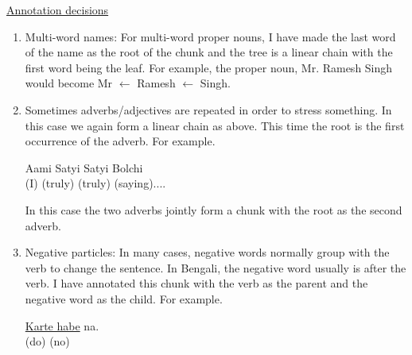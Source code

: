 \documentclass[11pt,letterpaper]{article}
\begin{document}
\underline{Annotation decisions}
\begin{enumerate}
\item Multi-word names: For multi-word proper nouns, I have made the last word of the name as the root of the chunk and the tree is a linear chain with the first word being the leaf. For example, the proper noun, Mr. Ramesh Singh would become Mr $\leftarrow$ Ramesh $\leftarrow$ Singh.
\item Sometimes adverbs/adjectives are repeated in order to stress something. In this case we again form a linear chain as above. This time the root is the first occurrence of the adverb. For example. \\
\begin{center}
Aami Satyi Satyi Bolchi\\
(I)       (truly) (truly) (saying)....\\
\end{center}
In this case the two adverbs jointly form a chunk with the root as the second adverb.
\item Negative particles: In many cases, negative words normally group with the verb to change the sentence. In Bengali, the negative word usually is after the verb. I have annotated this chunk with the verb as the parent and the negative word as the child. For example. \\
\begin{center}
\underline{Karte habe} na.\\
(do)					(no)


\end{center}
\end{enumerate}
\end{document}
